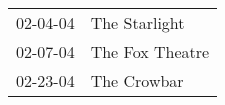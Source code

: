 \begin{supertabular}{p{0.07\textwidth}p{0.23\textwidth}}
 02-04-04 &    The Starlight \\
 02-07-04 &  The Fox Theatre \\
 02-23-04 &      The Crowbar \\
\end{supertabular}
